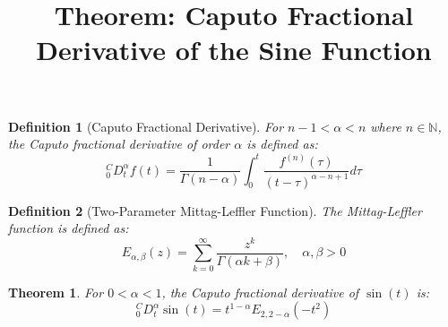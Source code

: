 \documentclass{article}
\title{Theorem: Caputo Fractional Derivative of the Sine Function}
\author{}
\date{}
\newtheorem{theorem}{Theorem}
\newtheorem{definition}{Definition}
\begin{document}
\maketitle

\begin{definition}[Caputo Fractional Derivative]
For $n-1 < \alpha < n$ where $n \in \mathbb{N}$, the Caputo fractional derivative of order $\alpha$ is defined as:
\begin{equation}
\label{eq:caputo_def}
_0^CD_t^\alpha f(t) = \frac{1}{\Gamma(n-\alpha)} \int_0^t \frac{f^{(n)}(\tau)}{(t-\tau)^{\alpha-n+1}} d\tau
\end{equation}
\end{definition}

\begin{definition}[Two-Parameter Mittag-Leffler Function]
\label{def:mittag_leffler}
The Mittag-Leffler function is defined as:
\begin{equation}
E_{\alpha,\beta}(z) = \sum_{k=0}^{\infty} \frac{z^k}{\Gamma(\alpha k + \beta)}, \quad \alpha, \beta > 0
\end{equation}
\end{definition}

\begin{theorem}
For $0 < \alpha < 1$, the Caputo fractional derivative of $\sin(t)$ is:
\begin{equation}
\label{eq:main_result}
_0^CD_t^\alpha \sin(t) = t^{1-\alpha} E_{2,2-\alpha}(-t^2)
\end{equation}
\end{theorem}
\end{document}
